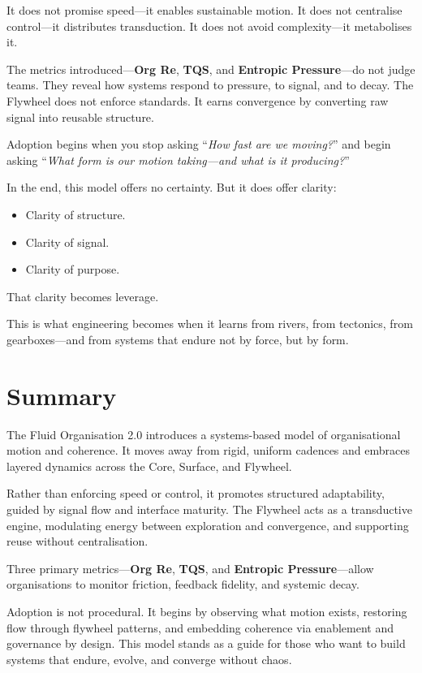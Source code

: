 \documentclass[12pt]{article}
\begin{document}
It does not promise speed—it enables sustainable motion. It does not centralise control—it distributes transduction. It does not avoid complexity—it metabolises it.

The metrics introduced—\textbf{Org Re}, \textbf{TQS}, and \textbf{Entropic Pressure}—do not judge teams. They reveal how systems respond to pressure, to signal, and to decay. The Flywheel does not enforce standards. It earns convergence by converting raw signal into reusable structure.

Adoption begins when you stop asking “\textit{How fast are we moving?}” and begin asking “\textit{What form is our motion taking—and what is it producing?}”

In the end, this model offers no certainty. But it does offer clarity:
\begin{itemize}
    \item Clarity of structure.
    \item Clarity of signal.
    \item Clarity of purpose.
\end{itemize}

That clarity becomes leverage.

This is what engineering becomes when it learns from rivers, from tectonics, from gearboxes—and from systems that endure not by force, but by form.

\newpage
\section*{Summary}


The Fluid Organisation 2.0 introduces a systems-based model of organisational motion and coherence. It moves away from rigid, uniform cadences and embraces layered dynamics across the Core, Surface, and Flywheel.

Rather than enforcing speed or control, it promotes structured adaptability, guided by signal flow and interface maturity. The Flywheel acts as a transductive engine, modulating energy between exploration and convergence, and supporting reuse without centralisation.

Three primary metrics—\textbf{Org Re}, \textbf{TQS}, and \textbf{Entropic Pressure}—allow organisations to monitor friction, feedback fidelity, and systemic decay.

Adoption is not procedural. It begins by observing what motion exists, restoring flow through flywheel patterns, and embedding coherence via enablement and governance by design. This model stands as a guide for those who want to build systems that endure, evolve, and converge without chaos.
\end{document}
